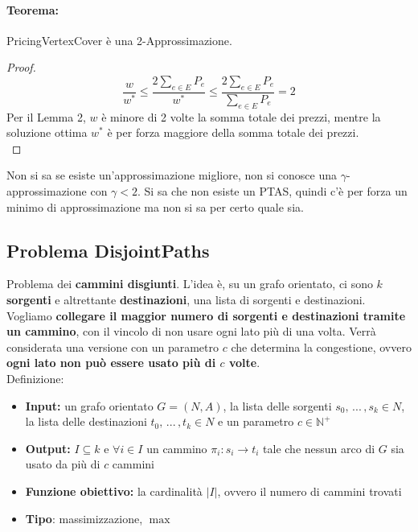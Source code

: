 \paragraph{Teorema:} PricingVertexCover è una 2-Approssimazione.\\

\begin{proof}
	$$ \frac{w}{w^\ast} \leq \frac{2 \sum_{e \in E} P_e}{w^\ast} \leq \frac{2 \sum_{e \in E} P_e}{\sum_{e \in E} P_e} = 2$$
	Per il Lemma 2, $w$ è minore di 2 volte la somma totale dei prezzi, mentre la soluzione ottima $w^\ast$ è per forza maggiore della somma totale dei prezzi. \\
\end{proof}

Non si sa se esiste un'approssimazione migliore, non si conosce una $\gamma$-approssimazione con $\gamma < 2$. Si sa che non esiste un PTAS, quindi c'è per forza un minimo di approssimazione ma non si sa per certo quale sia.\\

\newpage

\subsection{Problema DisjointPaths}

Problema dei \textbf{cammini disgiunti}. L'idea è, su un grafo orientato, ci sono $k$ \textbf{sorgenti} e altrettante \textbf{destinazioni}, una lista di sorgenti e destinazioni. Vogliamo \textbf{collegare il maggior numero di sorgenti e destinazioni tramite un cammino}, con il vincolo di non usare ogni lato più di una volta. Verrà considerata una versione con un parametro $c$ che determina la congestione, ovvero \textbf{ogni lato non può essere usato più di $c$ volte}.\\

Definizione: 
\begin{itemize}
	\item \textbf{Input:} un grafo orientato $G = (N,A)$, la lista delle sorgenti $s_0, \, ... \, , s_k \in N$, la lista delle destinazioni $t_0, \, ... \, , t_k \in N$ e un parametro $c \in \mathbb{N}^+$
	\item \textbf{Output:} $I \subseteq k$ e $\forall i \in I$ un cammino $\pi_i: s_i \rightarrow t_i$ tale che nessun arco di $G$ sia usato da più di $c$ cammini
	\item \textbf{Funzione obiettivo:} la cardinalità $|I|$, ovvero il numero di cammini trovati
	\item \textbf{Tipo}: massimizzazione, $\max$
\end{itemize}

